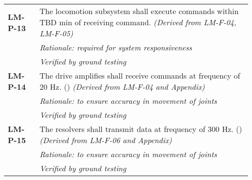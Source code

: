 \begin{longtable}{P{2cm}P{13.75cm}}
\textbf{LM-P-13}	& The locomotion subsystem shall execute commands within \gls{TBD} \gls{min} of receiving command. \textit{(Derived from LM-F-04, LM-F-05)} \\
 &	\textit{Rationale: required for system responsiveness} \\
 &	\textit{Verified by ground testing}	\\

\textbf{LM-P-14}	& The drive amplifies shall receive commands at frequency of 20 \gls{Hz}. (\textit{}) \textit{(Derived from LM-F-04 and Appendix)} \\
 &	\textit{Rationale: to ensure accuracy in movement of joints} \\
 &	\textit{Verified by ground testing}	\\
 
\textbf{LM-P-15}	& The resolvers shall transmit data at frequency of 300 \gls{Hz}. (\textit{}) \textit{(Derived from LM-F-06 and Appendix)} \\
 &	\textit{Rationale: to ensure accuracy in movement of joints} \\
 &	\textit{Verified by ground testing}
\end{longtable}